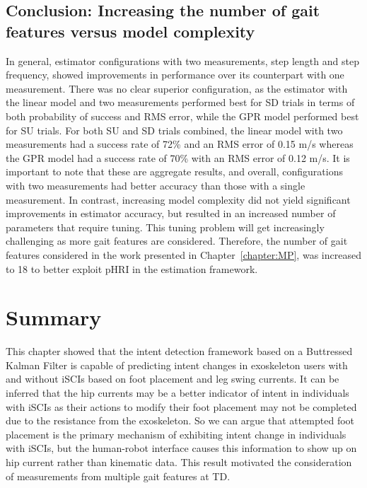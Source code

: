 \subsection{Conclusion: Increasing the number of gait features versus model complexity}\label{sec:analysis_conc}
In general, estimator configurations with two measurements, step length and step frequency, showed improvements in performance over its counterpart with one measurement. There was no clear superior configuration, as the estimator with the linear model and two measurements performed best for SD trials in terms of both probability of success and RMS error, while the GPR model performed best for SU trials. For both SU and SD trials combined, the linear model with two measurements had a success rate of 72\% and an RMS error of 0.15 m/s whereas the GPR model had a success rate of 70\% with an RMS error of 0.12 m/s. It is important to note that these are aggregate results, and overall, configurations with two measurements had better accuracy than those with a single measurement. In contrast, increasing  model complexity did not yield significant improvements in estimator accuracy, but resulted in an increased number of parameters that require tuning. This tuning problem will get increasingly challenging as more gait features are considered. Therefore, the number of gait features considered in the work presented in Chapter~\ref{chapter:MP}, was increased to 18 to better exploit pHRI in the estimation framework.

\section{Summary}\label{sec:bkf_summary}

This chapter showed that the intent detection framework based on a Buttressed Kalman Filter is capable of predicting intent changes in exoskeleton users with and without iSCIs based on foot placement and leg swing currents. It can be inferred that the hip currents may be a better indicator of intent in individuals with iSCIs as their actions to modify their foot placement may not be completed due to the resistance from the exoskeleton. So we can argue that attempted foot placement is the primary mechanism of exhibiting intent change in individuals with iSCIs, but the human-robot interface causes this information to show up on hip current rather than kinematic data. This result motivated the consideration of measurements from multiple gait features at TD.

